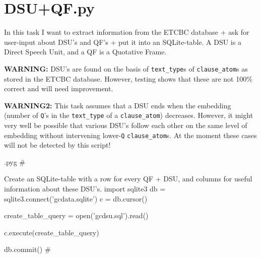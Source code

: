 \documentclass{report}
\makeatletter
\newcommand{\mi}[1]{\lstinline{#1}}
\newenvironment{python}{%
  \VerbatimEnvironment
  \minted@resetoptions
  \setkeys{minted@opt}{}
      \begin{VerbatimOut}{\jobname.pyg}}
{%
      \end{VerbatimOut}
      \minted@pygmentize{python}
      \DeleteFile{\jobname.pyg}}
\makeatother
\begin{document}
\chapter{DSU+QF.py}
\lstset{language=python,basicstyle=\ttfamily}

\begin{multicols}{2}
In this task I want to extract information from the ETCBC database + ask for user-input about DSU's and QF's + put it into an SQLite-table.
A DSU is a Direct Speech Unit, and a QF is a Quotative Frame.

\textbf{WARNING:} DSU's are found on the basis of \mi{text_type}s of \mi{clause_atom}s as stored in the ETCBC database. However, testing shows that these are not 100\% correct and will need improvement.

\textbf{WARNING2:} This task assumes that a DSU ends when the embedding (number of \mi{Q}'s in the \mi{text_type} of a \mi{clause_atom}) decreases.
However, it might very well be possible that various DSU's follow each other on the same level of embedding without intervening lower-\mi{Q} \mi{clause_atom}s.
At the moment these cases will not be detected by this script!
\end{multicols}

\begin{python}
#{{{ Create an SQLite-table with a row for every QF + DSU, and columns for useful information about these DSU's.
import sqlite3
db = sqlite3.connect('gcdata.sqlite')
c = db.cursor()

create_table_query = open('gcdsu.sql').read()

c.execute(create_table_query)

db.commit()
#}}}
\end{python}
\end{document}
